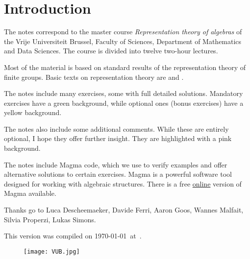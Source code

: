 \thispagestyle{plain}
\section*{Introduction}

The notes correspond to the master  
course \emph{Representation theory of algebras} of the 
Vrije Universiteit Brussel, 
Faculty of Sciences, 
Department of Mathematics and Data Sciences. The course
is divided into twelve two-hour lectures. 

Most of the material is based on standard 
results of the representation theory of finite groups. 
Basic texts on representation theory are \cite{MR1369573} 
and \cite{MR2270898}. 

The notes include many exercises, some with full detailed solutions. Mandatory exercises have a \colorbox{green!5!white}{green background}, while optional ones
(bonus exercises) have a \colorbox{yellow!15!white}{yellow background}.

The notes also include some additional comments. While these are entirely optional, I hope they offer further insight. They are highlighted with a \colorbox{red!5!white}{pink background}.

The notes include Magma code, which we use to verify examples and offer alternative solutions to certain exercises. Magma \cite{zbMATH01077111} is a powerful software tool designed for working with algebraic structures. There is a free \href{https://magma.maths.usyd.edu.au/calc/}{online} version of Magma available.


Thanks go to Luca Descheemaeker, Davide Ferri, Aaron Goos, 
Wannes Malfait, Silvia Properzi, Lukas Simons.  



This version 
was compiled on \today~at~\currenttime.


 \begin{figure}[b]
     \texttt{[image: VUB.jpg]}
 \end{figure}